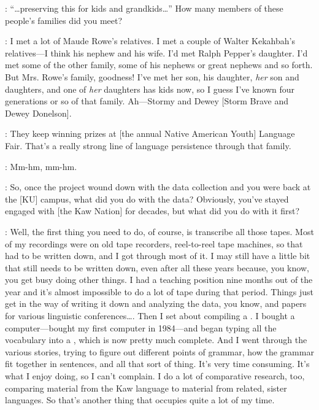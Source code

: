 \documentclass[output=paper]{LSP/langsci}
\begin{document}
: ``\ldots preserving this for kids and grandkids\ldots'' How many members of these people's families did you meet?

:  I met a lot of Maude Rowe's relatives. I met a couple of Walter Kekahbah's relatives---I think his nephew and his wife. I'd met Ralph Pepper's daughter. I'd met some of the other family, some of his nephews or great nephews and so forth. But Mrs. Rowe's family, goodness! I've met her son, his daughter, \textit{her} son and daughters, and one of \textit{her} daughters has kids now, so I guess I've known four generations or so of that family. Ah---Stormy and Dewey [Storm Brave and Dewey Donelson].

: They keep winning prizes at [the annual Native American Youth] Language Fair. That's a really strong line of language persistence through that family.

: Mm-hm, mm-hm.

: So, once the project wound down with the data collection and you were back at the [KU] campus, what did you do with the data? Obviously, you've stayed engaged with [the Kaw Nation] for decades, but what did you do with it first?

: Well, the first thing you need to do, of course, is transcribe all those tapes. Most of my recordings were on old tape recorders, reel-to-reel tape machines, so that had to be written down, and I got through most of it. I may still have a little bit that still needs to be written down, even after all these years because, you know, you get busy doing other things. I had a teaching position nine months out of the year and it's almost impossible to do a lot of tape  during that period. Things just get in the way of writing it down and analyzing the data, you know, and papers for various linguistic conferences{\ldots}. Then I set about compiling a . I bought a computer---bought my first computer in 1984---and began typing all the vocabulary into a , which is now pretty much complete. And I went through the various stories, trying to figure out different points of grammar, how the grammar fit together in sentences, and all that sort of thing. It's very time consuming. It's what I enjoy doing, so I can't complain. I do a lot of comparative research, too, comparing material from the Kaw language to material from related, sister languages. So that's another thing that occupies quite a lot of my time.
\end{document}
